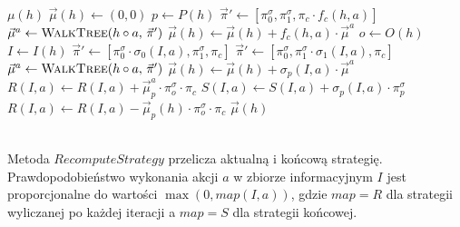 \documentclass[licencjacka]{pracamgr}
\begin{document}
\begin{algorithmic}
            \State \Return $\mu(h)$
        \EndIf
        \State $\vec{\mu}(h) \gets (0, 0)$ 
        \State $p \gets P(h)$
                \State $\vec{\pi}' \gets [\pi_0^{\sigma}, \pi_1^{\sigma}, \pi_c \cdot f_c(h, a)]$
                \State $\vec{\mu}^a \gets \Call{WalkTree}{h \circ a, \, \vec{\pi}'}$
                \State $\vec{\mu}(h) \gets \vec{\mu}(h) + f_c(h, a) \cdot \vec{\mu}^a$
            \EndFor
        \Else
            \State $o \gets O(h)$
            \State $I \gets I(h)$
                    \State $\vec{\pi}' \gets [\pi_0^{\sigma} \cdot \sigma_0(I, a), \pi_1^{\sigma}, \pi_c]$
                \Else
                    \State $\vec{\pi}' \gets [\pi_0^{\sigma}, \pi_1^{\sigma} \cdot \sigma_1(I, a), \pi_c]$
                \EndIf
                \State $\vec{\mu}^a \gets \Call{WalkTree}{h \circ a, \, \vec{\pi}'}$
                \State $\vec{\mu}(h) \gets \vec{\mu}(h) + \sigma_p(I, a) \cdot \vec{\mu}^a$
                \State $R(I, a) \gets R(I, a) + \vec{\mu}_p^a \cdot \pi_{o}^{\sigma} \cdot \pi_c $
                \State $S(I, a) \gets S(I, a) + \sigma_p(I, a) \cdot \pi_{p}^{\sigma}$
            \EndFor
                \State $R(I, a) \gets R(I, a) - \vec{\mu}_p(h) \cdot \pi_{o}^{\sigma} \cdot \pi_c $
            \EndFor
        \EndIf
    \State \Return $\vec{\mu}(h)$
    \EndFunction
\end{algorithmic}


$\,$ \\
Metoda $RecomputeStrategy$ przelicza aktualną i końcową strategię. Prawdopodobieństwo wykonania akcji $a$
w zbiorze informacyjnym $I$ jest proporcjonalne do wartości $\max(0, map(I, a))$, gdzie $map=R$ dla strategii
wyliczanej po każdej iteracji a $map=S$ dla strategii końcowej. \\
\end{document}
